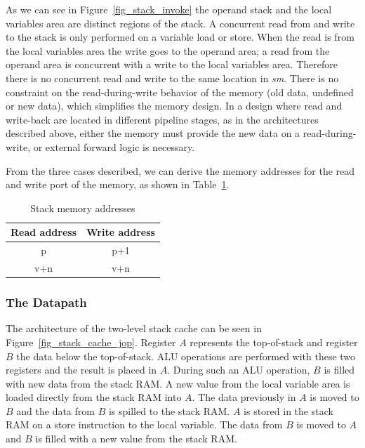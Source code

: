 As we can see in Figure~\ref{fig_stack_invoke} the operand stack and
the local variables area are distinct regions of the stack. A
concurrent read from and write to the stack is only performed on a
variable load or store. When the read is from the local variables
area the write goes to the operand area; a read from the operand
area is concurrent with a write to the local variables area.
Therefore there is no concurrent read and write to the same location
in \textit{sm}. There is no constraint on the read-during-write
behavior of the memory (old data, undefined or new data), which
simplifies the memory design. In a design where read and write-back
are located in different pipeline stages, as in the architectures
described above, either the memory must provide the new data on a
read-during-write, or external forward logic is necessary.

From the three cases described, we can derive the memory addresses
for the read and write port of the memory, as shown in
Table~\ref{tab_stack_address}.

\begin{table}[htbp]
    \centering
    \begin{tabular}{cc}
        \toprule
        Read address&Write address \\
        \midrule p&p+1 \\
        v+n&v+n \\
        \bottomrule
    \end{tabular}
    \caption{Stack memory addresses}
    \label{tab_stack_address}
\end{table}

\subsubsection{The Datapath}

The architecture of the two-level stack cache can be seen in
Figure~\ref{fig_stack_cache_jop}. Register $A$ represents the
top-of-stack and register $B$ the data below the top-of-stack. ALU
operations are performed with these two registers and the result is
placed in $A$. During such an ALU operation, $B$ is filled with new
data from the stack RAM. A new value from the local variable area is
loaded directly from the stack RAM into $A$. The data previously in
$A$ is moved to $B$ and the data from $B$ is spilled to the stack
RAM. $A$ is stored in the stack RAM on a store instruction to the
local variable. The data from $B$ is moved to $A$ and $B$ is filled
with a new value from the stack RAM.

